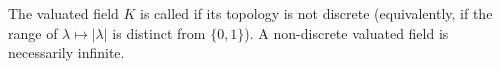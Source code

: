 The valuated field $K$ is called  if its topology is not discrete (equivalently, if the range of $\lambda \mapsto |\lambda|$ is distinct from $\{0,1\}$). A non-discrete valuated field is necessarily infinite.
